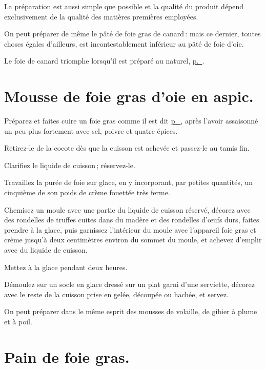 La préparation est aussi simple que possible et la qualité du produit dépend
exclusivement de la qualité des matières premières employées.

\sk

On peut préparer de même le pâté de foie gras de canard : mais ce dernier,
toutes choses égales d'ailleurs, est incontestablement inférieur au pâté de
foie d'oie.

Le foie de canard triomphe lorsqu'il est préparé au naturel,
\hyperlink{p0592}{p. \pageref{pg0592}}.

\section*{\centering Mousse de foie gras d'oie en aspic.}
{}

Préparez et faites cuire un foie gras comme il est dit
\hyperlink{p0596}{p. \pageref{pg0596}}, après l'avoir assaisonné un peu plus
fortement avec sel, poivre et quatre épices.

Retirez-le de la cocote dès que la cuisson est achevée et passez-le au tamis
fin.

Clarifiez le liquide de cuisson ; réservez-le.

Travaillez la purée de foie sur glace, en y incorporant, par petites quantités,
un cinquième de son poids de crème fouettée très ferme.

Chemisez un moule avec une partie du liquide de cuisson réservé, décorez avec
des rondelles de truffes cuites dans du madère et des rondelles d'œufs durs,
faites prendre à la glace, puis garnissez l'intérieur du moule avec l'appareil
foie gras et crème jusqu'à deux centimètres environ du sommet du moule, et
achevez d'emplir avec du liquide de cuisson.

Mettez à la glace pendant deux heures.

Démoulez sur un socle en glace dressé sur un plat garni d'une serviette,
décorez avec le reste de la cuisson prise en gelée, découpée ou hachée, et
servez.

\sk

On peut préparer dans le même esprit des mousses de volaille, de gibier à plume
et à poil.

\section*{\centering Pain de foie gras.}
{}

